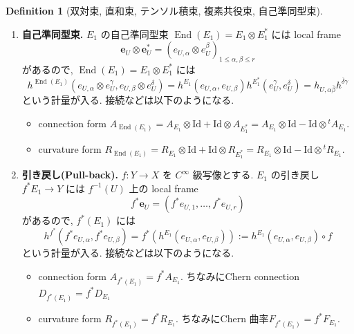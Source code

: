\documentclass[dvipdfmx,a4paper,11pt]{article} %
\theoremstyle{definition}
\newtheorem{defn}[thm]{Definition}
\theoremstyle{remark}
\numberwithin{equation}{section}
\newcommand{\End}[0]{\operatorname{End}}
\begin{document}
\begin{defn}[双対束, 直和束, テンソル積束, 複素共役束, 自己準同型束]
\begin{enumerate}
\item \textbf{自己準同型束.}
 \(E_1\) の自己準同型束 \(\End(E_1)=E_1 \otimes E_1^{*}\)
には local frame
\[
\mathbf{e}_U\otimes\mathbf{e}_U^*=(e_{U,\alpha}\otimes e^{\beta}_U)_{1\leq \alpha,\beta\leq r}
\]
があるので, \(\End(E_1)=E_1 \otimes E_1^{*}\) には
\[
h^{\End (E_1)}(e_{U,\alpha}\otimes e_U^\gamma, e_{U,\beta}\otimes e_U^\delta)
= h^{E_1}(e_{U,\alpha},  e_{U,\beta})h^{E_1^{*}}( e_U^\gamma,  e_U^\delta)
=h_{U,\alpha\overline{\beta}}h^{\overline{\delta}\gamma}
\]
という計量が入る. 接続などは以下のようになる.
\begin{itemize}
\item connection form
\(
A_{\End(E_1)}=A_{E_1}\otimes \mathrm{Id}+ \mathrm{Id}\otimes A_{E_1^{*}}
=A_{E_1}\otimes \mathrm{Id}-  \mathrm{Id}\otimes {}^tA_{E_1}.
\)
\item curvature form
\(
R_{\End(E_1)}=R_{E_1}\otimes \mathrm{Id}+ \mathrm{Id}\otimes R_{E_1^*}
= R_{E_1}\otimes \mathrm{Id} - \mathrm{Id}\otimes {}^tR_{E_1}.
\)
\end{itemize}

\item \textbf{引き戻し(Pull-back).} \(f : Y \to X\) を \(C^\infty\) 級写像とする. \(E_1\) の引き戻し \(f^{*}E_1 \to Y\) には \(f^{-1}(U)\) 上の local frame
\[
f^{*}\mathbf{e}_U=
(f^{*}e_{U, 1}, \ldots, f^{*}e_{U, r})
\]
があるので, \(f^*(E_1)\) には
\[
h^{f^{*}}(f^{*}e_{U,\alpha},  f^{*}e_{U,\beta})
= f^{*}(h^{E_1}(e_{U,\alpha},  e_{U,\beta})) 
:=h^{E_1}(e_{U,\alpha},  e_{U,\beta}) \circ f
\]
という計量が入る. 接続などは以下のようになる.
\begin{itemize}
\item connection form
\(
A_{f^*(E_1)}=f^*A_{E_1}.
\)
ちなみにChern connection $D_{f^*(E_1)}=f^*D_{E_1}$
\item curvature form
\(
R_{f^*(E_1)}=f^*R_{E_1}.
\)
ちなみにChern 曲率$F_{f^*(E_1)}=f^*F_{E_1}.$
\end{itemize}
\end{enumerate}
\end{defn}
\end{document}
